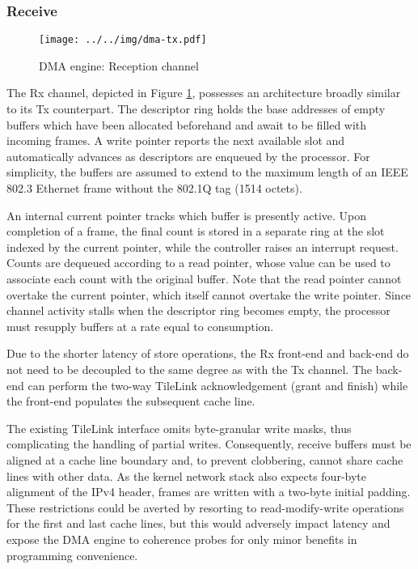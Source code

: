 \subsubsection{Receive}

\begin{figure}[t]
\begin{center}
\texttt{[image: ../../img/dma-tx.pdf]}
\caption{DMA engine: Reception channel}
\label{fig:dma-rx}
\end{center}
\end{figure}

The Rx channel, depicted in Figure \ref{fig:dma-rx}, possesses an
architecture broadly similar to its Tx counterpart.
The descriptor ring holds the base addresses of empty buffers which have
been allocated beforehand and await to be filled with incoming frames.
A write pointer reports the next available slot and automatically
advances as descriptors are enqueued by the processor.
For simplicity, the buffers are assumed to extend to the maximum length
of an IEEE 802.3 Ethernet frame without the 802.1Q tag (1514 octets).

An internal current pointer tracks which buffer is presently active.
Upon completion of a frame, the final count is stored in a separate ring
at the slot indexed by the current pointer, while the controller raises
an interrupt request.
Counts are dequeued according to a read pointer, whose value can be used
to associate each count with the original buffer.
Note that the read pointer cannot overtake the current pointer, which
itself cannot overtake the write pointer.
Since channel activity stalls when the descriptor ring becomes empty,
the processor must resupply buffers at a rate equal to consumption.

Due to the shorter latency of store operations, the Rx front-end and
back-end do not need to be decoupled to the same degree as with the Tx
channel.
The back-end can perform the two-way TileLink acknowledgement (grant and
finish) while the front-end populates the subsequent cache line.

The existing TileLink interface omits byte-granular write masks, thus
complicating the handling of partial writes.
Consequently, receive buffers must be aligned at a cache line boundary
and, to prevent clobbering, cannot share cache lines with other data.
As the kernel network stack also expects four-byte alignment of the IPv4
header, frames are written with a two-byte initial padding.
These restrictions could be averted by resorting to read-modify-write
operations for the first and last cache lines, but this would adversely
impact latency and expose the DMA engine to coherence probes for only
minor benefits in programming convenience.
